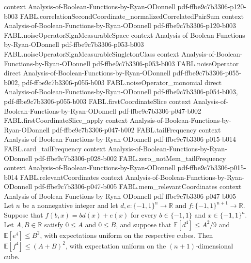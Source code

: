 \begin{theorem}
  {context}
  {Analysis-of-Boolean-Functions-by-Ryan-ODonnell}
  {pdf-ffbe9c7b3306-p120-b003}
\proofstep
  {FABL.correlationSecondCoordinate_normalizedCorrelatedPairSum}
  {context}
  {Analysis-of-Boolean-Functions-by-Ryan-ODonnell}
  {pdf-ffbe9c7b3306-p120-b003}
\proofstep
  {FABL.noiseOperatorSignMeasurableSpace}
  {context}
  {Analysis-of-Boolean-Functions-by-Ryan-ODonnell}
  {pdf-ffbe9c7b3306-p053-b003}
\proofstep
  {FABL.noiseOperatorSignMeasurableSingletonClass}
  {context}
  {Analysis-of-Boolean-Functions-by-Ryan-ODonnell}
  {pdf-ffbe9c7b3306-p053-b003}
\proofstep
  {FABL.noiseOperator}
  {direct}
  {Analysis-of-Boolean-Functions-by-Ryan-ODonnell}
  {pdf-ffbe9c7b3306-p055-b002,
    pdf-ffbe9c7b3306-p055-b003}
\proofstep
  {FABL.noiseOperator_monomial}
  {direct}
  {Analysis-of-Boolean-Functions-by-Ryan-ODonnell}
  {pdf-ffbe9c7b3306-p054-b003,
    pdf-ffbe9c7b3306-p055-b003}
\proofstep
  {FABL.firstCoordinateSlice}
  {context}
  {Analysis-of-Boolean-Functions-by-Ryan-ODonnell}
  {pdf-ffbe9c7b3306-p047-b002}
\proofstep
  {FABL.firstCoordinateSlice_apply}
  {context}
  {Analysis-of-Boolean-Functions-by-Ryan-ODonnell}
  {pdf-ffbe9c7b3306-p047-b002}
\proofstep
  {FABL.tailFrequency}
  {context}
  {Analysis-of-Boolean-Functions-by-Ryan-ODonnell}
  {pdf-ffbe9c7b3306-p015-b014}
\proofstep
  {FABL.card_tailFrequency}
  {context}
  {Analysis-of-Boolean-Functions-by-Ryan-ODonnell}
  {pdf-ffbe9c7b3306-p028-b002}
\proofstep
  {FABL.zero_notMem_tailFrequency}
  {context}
  {Analysis-of-Boolean-Functions-by-Ryan-ODonnell}
  {pdf-ffbe9c7b3306-p015-b014}
\proofstep
  {FABL.relevantCoordinates}
  {context}
  {Analysis-of-Boolean-Functions-by-Ryan-ODonnell}
  {pdf-ffbe9c7b3306-p047-b005}
\proofstep
  {FABL.mem_relevantCoordinates}
  {context}
  {Analysis-of-Boolean-Functions-by-Ryan-ODonnell}
  {pdf-ffbe9c7b3306-p047-b005}
Let $n$ be a nonnegative integer and let $d,e:\{-1,1\}^n\to\mathbb R$ and
$f:\{-1,1\}^{n+1}\to\mathbb R$. Suppose that $f(b,x)=bd(x)+e(x)$ for every
$b\in\{-1,1\}$ and $x\in\{-1,1\}^n$. Let $A,B\in\mathbb R$ satisfy $0\le A$ and $0\le
B$, and suppose that $\mathbb E[d^4]\le A^2/9$ and $\mathbb E[e^4]\le B^2$, with
expectations uniform on the respective cubes. Then $\mathbb E[f^4]\le(A+B)^2$, with
expectation uniform on the $(n+1)$-dimensional cube.
\end{theorem}

